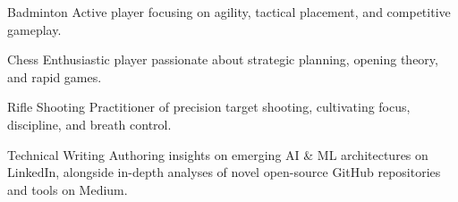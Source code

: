 



\begin{cvskills}
  \cvskill
    {Badminton} %
    {Active player focusing on agility, tactical placement, and competitive gameplay.} %

  \cvskill
    {Chess} %
    {Enthusiastic player passionate about strategic planning, opening theory, and rapid games.} %

  \cvskill
    {Rifle Shooting} %
    {Practitioner of precision target shooting, cultivating focus, discipline, and breath control.} %

  \cvskill
    {Technical Writing} %
    {Authoring insights on emerging AI \& ML architectures on LinkedIn, alongside in-depth analyses of novel open-source GitHub repositories and tools on Medium.} %

\end{cvskills}
